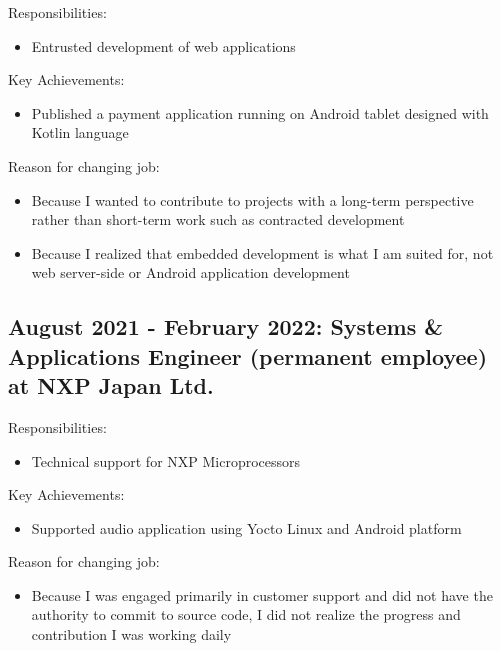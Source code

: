 \documentclass[letterpaper]{article}
\begin{document}
\noindent Responsibilities:

\begin{itemize}
  \item Entrusted development of web applications
\end{itemize}

\noindent Key Achievements:

\begin{itemize}
  \item Published a payment application running on Android tablet designed with Kotlin language
\end{itemize}

\noindent Reason for changing job:

\begin{itemize}
  \item Because I wanted to contribute to projects with a long-term perspective rather than short-term work such as contracted development
  \item Because I realized that embedded development is what I am suited for, not web server-side or Android application development
\end{itemize}

\subsection*{August 2021 - February 2022: Systems \& Applications Engineer  (permanent employee) at NXP Japan Ltd.}

\noindent Responsibilities:

\begin{itemize}
  \item Technical support for NXP Microprocessors
\end{itemize}

\noindent Key Achievements:

\begin{itemize}
  \item Supported audio application using Yocto Linux and Android platform
\end{itemize}

\noindent Reason for changing job:

\begin{itemize}
  \item Because I was engaged primarily in customer support and did not have the authority to commit to source code, I did not realize the progress and contribution I was working daily
\end{itemize}
\end{document}
